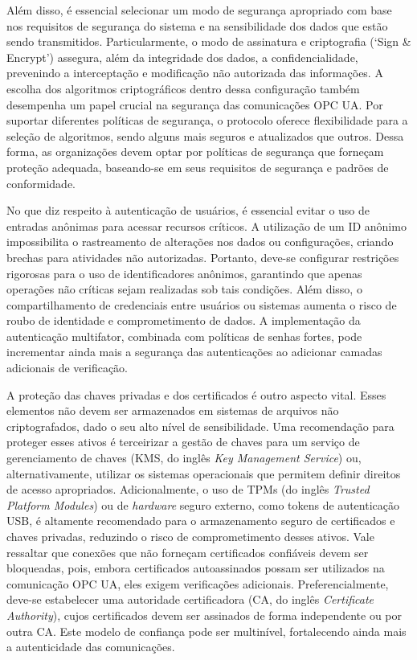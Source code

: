         Além disso, é essencial selecionar um modo de segurança apropriado com base nos requisitos de segurança do sistema e na sensibilidade dos dados que estão sendo transmitidos. Particularmente, o modo de assinatura e criptografia (`Sign & Encrypt') assegura, além da integridade dos dados, a confidencialidade, prevenindo a interceptação e modificação não autorizada das informações. A escolha dos algoritmos criptográficos dentro dessa configuração também desempenha um papel crucial na segurança das comunicações OPC UA. Por suportar diferentes políticas de segurança, o protocolo oferece flexibilidade para a seleção de algoritmos, sendo alguns mais seguros e atualizados que outros. Dessa forma, as organizações devem optar por políticas de segurança que forneçam proteção adequada, baseando-se em seus requisitos de segurança e padrões de conformidade.
        
        No que diz respeito à autenticação de usuários, é essencial evitar o uso de entradas anônimas para acessar recursos críticos. A utilização de um ID anônimo impossibilita o rastreamento de alterações nos dados ou configurações, criando brechas para atividades não autorizadas. Portanto, deve-se configurar restrições rigorosas para o uso de identificadores anônimos, garantindo que apenas operações não críticas sejam realizadas sob tais condições. Além disso, o compartilhamento de credenciais entre usuários ou sistemas aumenta o risco de roubo de identidade e comprometimento de dados. A implementação da autenticação multifator, combinada com políticas de senhas fortes, pode incrementar ainda mais a segurança das autenticações ao adicionar camadas adicionais de verificação.

        A proteção das chaves privadas e dos certificados é outro aspecto vital. Esses elementos não devem ser armazenados em sistemas de arquivos não criptografados, dado o seu alto nível de sensibilidade. Uma recomendação para proteger esses ativos é terceirizar a gestão de chaves para um serviço de gerenciamento de chaves (KMS, do inglês \textit{Key Management Service}) ou, alternativamente, utilizar os sistemas operacionais que permitem definir direitos de acesso apropriados. Adicionalmente, o uso de TPMs (do inglês \textit{Trusted Platform Modules}) ou de \textit{hardware} seguro externo, como tokens de autenticação USB, é altamente recomendado para o armazenamento seguro de certificados e chaves privadas, reduzindo o risco de comprometimento desses ativos. Vale ressaltar que conexões que não forneçam certificados confiáveis devem ser bloqueadas, pois, embora certificados autoassinados possam ser utilizados na comunicação OPC UA, eles exigem verificações adicionais. Preferencialmente, deve-se estabelecer uma autoridade certificadora (CA, do inglês \textit{Certificate Authority}), cujos certificados devem ser assinados de forma independente ou por outra CA. Este modelo de confiança pode ser multinível, fortalecendo ainda mais a autenticidade das comunicações.

